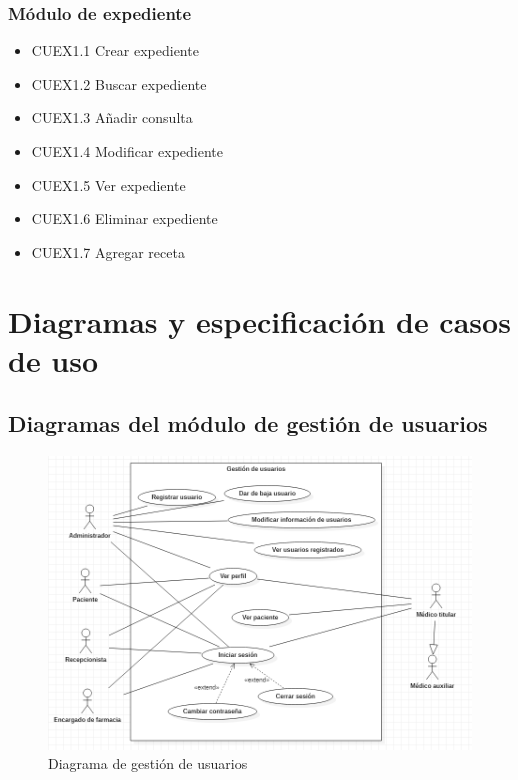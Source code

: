 \documentclass[12pt,letterpaper]{article}
\begin{document}
                \subsubsection{Módulo de expediente}
                    \begin{itemize}
                        \item CUEX1.1 Crear expediente 
                        \item CUEX1.2 Buscar expediente 
                        \item CUEX1.3 Añadir consulta 
                        \item CUEX1.4 Modificar expediente 
                        \item CUEX1.5 Ver expediente 
                        \item CUEX1.6 Eliminar expediente 
                        \item CUEX1.7 Agregar receta
                    \end{itemize}

    \section{Diagramas y especificación de casos de uso}
        \subsection{Diagramas del módulo de gestión de usuarios}
            \begin{figure}[H]
                \centering
                \includegraphics [scale=0.5]{casosUso/gestionUsuarios}
                \caption{Diagrama de gestión de usuarios}
            \end{figure}
\end{document}
